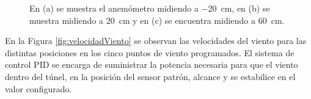 \begin{figure}[H]
\begin{minipage}[b]{0.33\textwidth}
        \centering
    \end{minipage}
    \begin{minipage}[b]{0.5\textwidth}
        \centering
    \end{minipage}
    
    \caption{En (a) se muestra el anemómetro midiendo a \SI{-20}{\centi\meter}, en (b) se muestra midiendo a \SI{20}{\centi\meter} y en (c) se encuentra midiendo a \SI{60}{\centi\meter}.}
    \label{fig:caracterPuntos}
\end{figure}

En la Figura \ref{fig:velocidadViento} se observan las velocidades del viento para las distintas posiciones en los cinco puntos de viento programados. El sistema de control PID se encarga de suministrar la potencia necesaria para que el viento dentro del túnel, en la posición del sensor patrón, alcance y se estabilice en el valor configurado.

